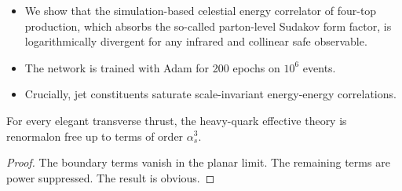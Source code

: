 \begin{itemize}
  \item We show that the simulation-based celestial energy correlator of four-top production, which absorbs the so-called parton-level Sudakov form factor, is logarithmically divergent for any infrared and collinear safe observable.
  \item The network is trained with Adam for 200 epochs on $10^6$ events.
  \item Crucially, jet constituents saturate scale-invariant energy-energy correlations.
\end{itemize}

\begin{proposition}\label{thm:4}
For every elegant transverse thrust, the heavy-quark effective theory is
renormalon free up to terms of order $\alpha_s^3$.
\end{proposition}

\begin{proof}
The boundary terms vanish in the planar limit. The remaining terms are
power suppressed. The result is obvious.
\end{proof}

